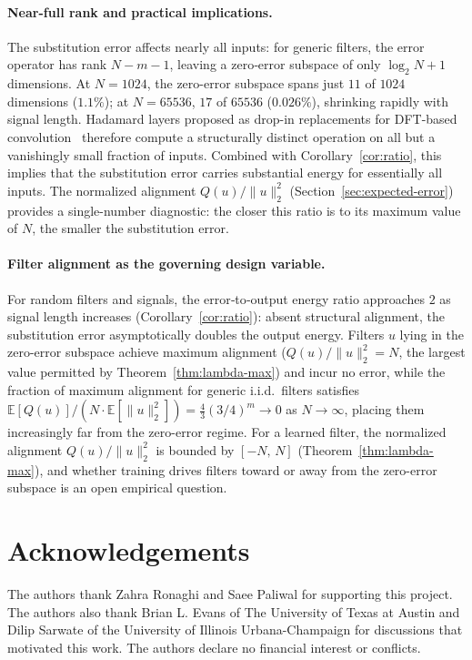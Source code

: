\documentclass[10pt,a4paper]{amsart}
\begin{document}
\paragraph{Near-full rank and practical implications.}
The substitution error affects nearly all inputs: for generic filters, the error operator has rank $N-m-1$, leaving a zero‑error subspace of only $\log_2 N + 1$ dimensions. At $N=1024$, the zero-error subspace spans just $11$ of $1024$ dimensions ($1.1\%$); at $N=65536$, $17$ of $65536$ ($0.026\%$), shrinking rapidly with signal length. Hadamard layers proposed as drop-in replacements for DFT-based convolution~\cite{pan2021fast, pan2022block, pan2023htlayer} therefore compute a structurally distinct operation on all but a vanishingly small fraction of inputs. Combined with Corollary~\ref{cor:ratio}, this implies that the substitution error carries substantial energy for essentially all inputs. The normalized alignment $Q(u)/\|u\|_2^2$ (Section~\ref{sec:expected-error}) provides a single-number diagnostic: the closer this ratio is to its maximum value of $N$, the smaller the substitution error.

\paragraph{Filter alignment as the governing design variable.}
For random filters and signals, the error‑to‑output energy ratio approaches $2$ as signal length increases (Corollary~\ref{cor:ratio}): absent structural alignment, the substitution error asymptotically doubles the output energy. Filters $u$ lying in the zero-error subspace achieve maximum alignment ($Q(u)/\|u\|_2^2 = N$, the largest value permitted by Theorem~\ref{thm:lambda-max}) and incur no error, while the fraction of maximum alignment for generic i.i.d.\ filters satisfies $\mathbb{E}[Q(u)]/(N\cdot\mathbb{E}[\|u\|_2^2]) = \tfrac{4}{3}(3/4)^m \to 0$ as $N\to\infty$, placing them increasingly far from the zero-error regime. For a learned filter, the normalized alignment $Q(u)/\|u\|_2^2$ is bounded by $[-N,\,N]$ (Theorem~\ref{thm:lambda-max}), and whether training drives filters toward or away from the zero-error subspace is an open empirical question.


\section{Acknowledgements}

The authors thank Zahra Ronaghi and Saee Paliwal for supporting this project. The authors also thank Brian L. Evans of The University of Texas at Austin and Dilip Sarwate of the University of Illinois Urbana-Champaign for discussions that motivated this work. The authors declare no financial interest or conflicts.
\end{document}
